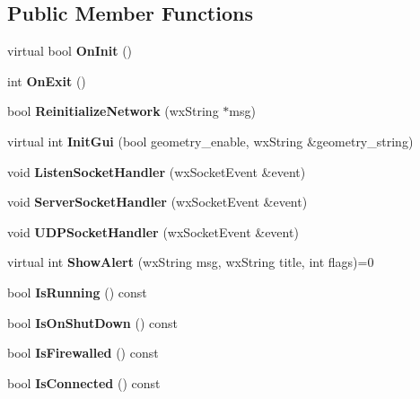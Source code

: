 \subsection*{Public Member Functions}
\begin{DoxyCompactItemize}
\item 
virtual bool {\bfseries OnInit} ()\label{classCamuleApp_a86799f1fb2e952e2fc8dbee1a595002a}

\item 
int {\bfseries OnExit} ()\label{classCamuleApp_aded5cbe20d0a3b27de7893cac45a7914}

\item 
bool {\bfseries ReinitializeNetwork} (wxString $\ast$msg)\label{classCamuleApp_ad653c8ee215b2ecd96d456e3d014f067}

\item 
virtual int {\bfseries InitGui} (bool geometry\_\-enable, wxString \&geometry\_\-string)\label{classCamuleApp_acd84d67229351bc843985134ba6206a6}

\item 
void {\bfseries ListenSocketHandler} (wxSocketEvent \&event)\label{classCamuleApp_ac6061b38228eb9b74f33d1d3d13b2b2f}

\item 
void {\bfseries ServerSocketHandler} (wxSocketEvent \&event)\label{classCamuleApp_a5f5d73a05839bd5264385d158dd82ccf}

\item 
void {\bfseries UDPSocketHandler} (wxSocketEvent \&event)\label{classCamuleApp_a34b92105ef9bbbc5cdfb307c4a98dfe9}

\item 
virtual int {\bfseries ShowAlert} (wxString msg, wxString title, int flags)=0\label{classCamuleApp_aec7d0abb5beddd3e7d1bbf361d443b2c}

\item 
bool {\bfseries IsRunning} () const \label{classCamuleApp_a955a82c41b7b86d8a91cfe7d31eab5e6}

\item 
bool {\bfseries IsOnShutDown} () const \label{classCamuleApp_ad7200fea0f77f95e329ae7c08ee4a6b5}

\item 
bool {\bfseries IsFirewalled} () const \label{classCamuleApp_a6e1375c9d4b0c3962fe70905badfc651}

\item 
bool {\bfseries IsConnected} () const \label{classCamuleApp_a85d2f9bd41b6f9757b5b4e79afb0a3d2}


\end{DoxyCompactItemize}
